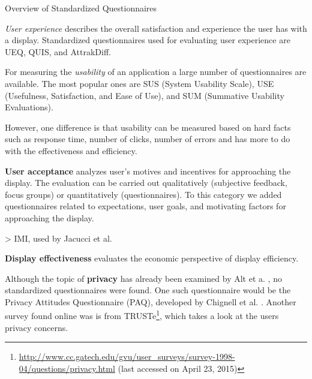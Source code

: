 
		\begin{table}[p]
			\small
			\center
			\begin{adjustwidth}{-1.5cm}{}
			    
			    \caption[Standardized Questionnaires]{Overview of Standardized Questionnaires}
			\label{table:standardized-questionnaires}
			            \end{adjustwidth}

		\end{table}


	

\clearpage


	\textit{User experience} describes the overall satisfaction and experience the user has with a display. Standardized questionnaires used for evaluating user experience are UEQ, QUIS, and AttrakDiff. 

	For measuring the \textit{usability} of an application a large number of questionnaires are available. The most popular ones are SUS (System Usability Scale), USE (Usefulness, Satisfaction, and Ease of Use), and SUM (Summative Usability Evaluations).

 
	However, one difference is that usability can be measured based on hard facts such as response time, number of clicks, number of errors and has more to do with the effectiveness and efficiency. 


	\textbf{User acceptance} analyzes user's motives and incentives for approaching the display. The evaluation can be carried out qualitatively (subjective feedback, focus groups) or quantitatively (questionnaires). To this category we added questionnaires related to expectations, user goals, and motivating factors for approaching the display. 

		> IMI, used by Jacucci et al. \cite{jacucci2010worldsofinformation}


			\textbf{Display effectiveness} evaluates the economic perspective of display efficiency. 

	Although the topic of \textbf{privacy} has already been examined by Alt et a. \cite{alt2011digifieds}, no standardized questionnaires were found. One such questionnaire would be the Privacy Attitudes Questionnaire (PAQ), developed by Chignell et al. \cite{chignell2003privacy}. Another survey found online was is from TRUSTe\footnote{\url{http://www.cc.gatech.edu/gvu/user_surveys/survey-1998-04/questions/privacy.html} (last accessed on April 23, 2015)}, which takes a look at the users privacy concerns.

